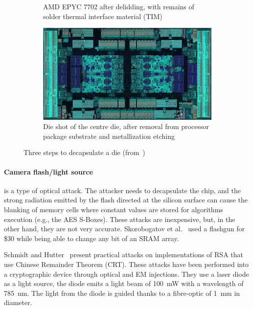 \begin{figure}[ht]
\begin{subfigure}[b]{0.3\textwidth}
        \caption{AMD EPYC 7702 after delidding, with remains of solder thermal interface material (TIM)}
        \label{fig:delidding_die}
    \end{subfigure}
    \hfill
    \begin{subfigure}[b]{0.3\textwidth}
        \includegraphics[width=\textwidth]{c2_soa/img/epyc_7702_packagedRemoved.jpg}
        \caption{Die shot of the centre die, after removal from processor package substrate and metallization etching}
        \label{fig:packagedRemoved_die}
    \end{subfigure}
    \caption{Three steps to decapsulate a die (from~\cite{decapping-19-wikipedia})}
    \label{fig:decapsulating_die}
\end{figure}


\paragraph{Camera flash/light source} is a type of optical attack. The attacker needs to decapsulate the chip, and the strong radiation emitted by the flash directed at the silicon surface can cause the blanking of memory cells where constant values are stored for algorithms execution (e.g., the AES S-Boxes). These attacks are inexpensive, but, in the other hand, they are not very accurate. Skorobogatov et al.~\cite{SA-02-ches} used a flashgun for \$30 while being able to change any bit of an SRAM array.

Schmidt and Hutter~\cite{SH-07-austrochip} present practical attacks on implementations of RSA that use Chinese Remainder Theorem (CRT). These attacks have been performed into a cryptographic device through optical and EM injections. They use a laser diode  as a light source, the diode emits a light  beam of \SI{100}{\milli\watt} with a wavelength of \SI{785}{\nano\metre}. The light from the diode is guided thanks to a fibre-optic of 1~mm in diameter.

